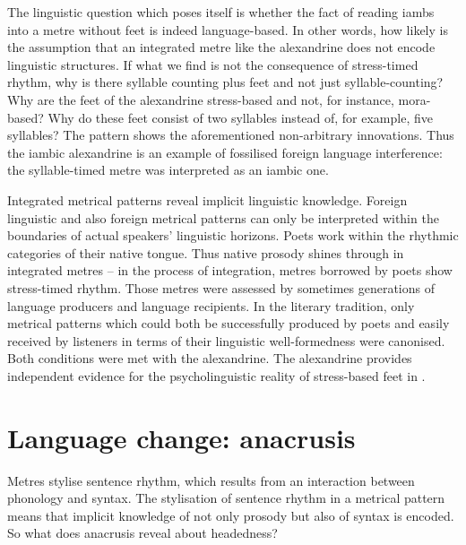 \documentclass[output=paper
  ,nobabel
  ,uniformtopskip %
]{langscibook}
\begin{document}
The linguistic question which poses itself is whether the fact of reading iambs into a metre without feet is indeed language-based. In other words, how likely is the assumption that an integrated metre like the  alexandrine does not encode linguistic structures. If what we find is not the consequence of stress-timed  rhythm, why is there syllable counting plus feet and not just syllable-counting? Why are the feet of the  alexandrine stress-based and not, for instance, mora-based? Why do these feet consist of two syllables instead of, for example, five syllables? The  pattern shows the aforementioned non-arbitrary innovations. Thus the  iambic alexandrine is an example of fossilised foreign language interference: the  syllable-timed metre was interpreted as an iambic one. 

  Integrated metrical patterns reveal implicit linguistic knowledge. Foreign linguistic and also foreign metrical patterns can only be interpreted within the boundaries of actual speakers' linguistic horizons. Poets work within the rhythmic categories of their native tongue. Thus native prosody shines through in integrated metres – in the process of integration, metres borrowed by  poets show stress-timed rhythm. Those metres were assessed by sometimes generations of language producers and language recipients. In the  literary tradition, only metrical patterns which could both be successfully produced by poets and easily received by listeners in terms of their linguistic well-formedness were canonised. Both conditions were met with the  alexandrine. The  alexandrine provides independent evidence for the psycholinguistic reality of stress-based feet in . 

\section{Language change: anacrusis}\label{sec-anacrusis}

Metres stylise sentence rhythm, which results from an interaction between phonology and syntax. The stylisation of sentence rhythm in a metrical pattern means that implicit knowledge of not only prosody but also of syntax is encoded. So what does  anacrusis reveal about headedness?
\end{document}
